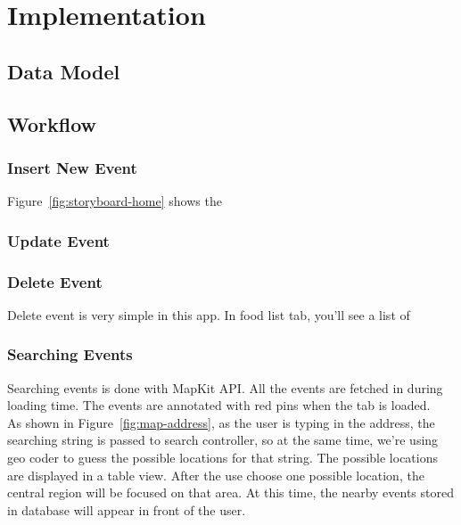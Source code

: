 \chapter{Implementation}

\section{Data Model} %


\newpage

\section{Workflow} %
\label{sec:work_overflow}

\subsection{Insert New Event} %
\label{sub:insert_new_event}
	Figure~\ref{fig:storyboard-home} shows the 

\subsection{Update Event} %
\label{sub:update_event}



\subsection{Delete Event} %
\label{sub:delete_event}

	Delete event is very simple in this app. In food list tab, you'll see a list of 

\subsection{Searching Events} %
\label{sub:searching_logic}
	
	Searching events is done with MapKit API. All the events are fetched in during loading time. The events are annotated with red pins when the tab is loaded.   \\
	As shown in Figure~\ref{fig:map-address}, as the user is typing in the address, the searching string is passed to search controller, so at the same time, we're using geo coder to guess the possible locations for that string. The possible locations are displayed in a table view. After the use choose one possible location, the central region will be focused on that area. At this time, the nearby events stored in database will appear in front of the user.
	

